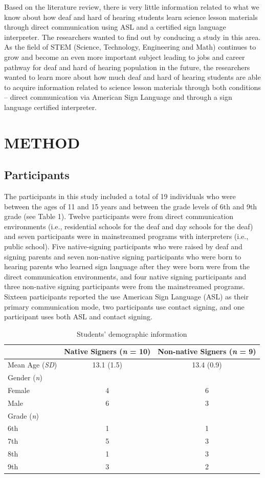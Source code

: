 \documentclass[11.5pt]{sig-alternate} %
\begin{document}
\begin{large}
Based on the literature review, there is very little information related to what we know about how deaf and hard of hearing students learn science lesson materials through direct communication using ASL and a certified sign language interpreter. The researchers wanted to find out by conducing a study in this area. As the field of STEM (Science, Technology, Engineering and Math) continues to grow and become an even more important subject leading to jobs and career pathway for deaf and hard of hearing population in the future, the researchers wanted to learn more about how much deaf and hard of hearing students are able to acquire information related to science lesson materials through both conditions – direct communication via American Sign Language and through a sign language certified interpreter.

\section*{METHOD}

\subsection*{Participants}

The participants in this study included a total of 19 individuals who were between the ages of 11 and 15 years and between the grade levels of 6th and 9th grade (see Table 1). Twelve participants were from direct communication environments (i.e., residential schools for the deaf and day schools for the deaf) and seven participants were in mainstreamed programs with interpreters (i.e., public school). Five native-signing participants who were raised by deaf and signing parents and seven non-native signing participants who were born to hearing parents who learned sign language after they were born were from the direct communication environments, and four native signing participants and three non-native signing participants were from the mainstreamed programs. Sixteen participants reported the use American Sign Language (ASL) as their primary communication mode, two participants use contact signing, and one participant uses both ASL and contact signing.

\begin{table}[h]
\caption{Students’ demographic information}
\begin{tabular}{lcc}
\hline
& Native Signers (\textit{n} = 10) & Non-native Signers (\textit{n} = 9) \\ \hline
Mean Age (\textit{SD}) & 13.1 (1.5) & 13.4 (0.9) \\
Gender (\textit{n}) & & \\
Female & 4 & 6 \\
Male & 6 & 3 \\
Grade (\textit{n}) & & \\
6th & 1 & 1 \\
7th & 5 & 3 \\
8th & 1 & 3 \\
9th	& 3 & 2 \\ \hline
\end{tabular}
\end{table}


\end{large}
\end{document}
